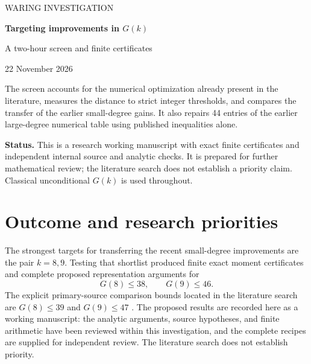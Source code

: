 \documentclass[11pt,letterpaper]{article}
\numberwithin{equation}{section}
\begin{document}
\begin{titlepage}
\thispagestyle{empty}
\vspace*{0.6in}
{\large\color{blue!45!black}WARING INVESTIGATION\par}
\vspace{0.3in}
{\huge\bfseries Targeting improvements in $G(k)$\par}
\vspace{0.22in}
{\Large A two-hour screen and finite certificates\par}
\vspace{0.18in}
{\large 22 November 2026\par}
\vspace{0.6in}
\par
\vspace{0.45in}
The screen accounts for the numerical optimization already present in the
literature, measures the distance to strict integer thresholds, and compares
the transfer of the earlier small-degree gains. It also repairs 44 entries
of the earlier large-degree numerical table using published inequalities
alone.
\par
\vfill
\textbf{Status.} This is a research working manuscript with exact finite
certificates and independent internal source and analytic checks. It is
prepared for further mathematical review; the literature search does not
establish a priority claim. Classical unconditional $G(k)$ is used throughout.
\end{titlepage}
\tableofcontents
\clearpage
{}

\section{Outcome and research priorities}
\label{sec:outcome}

The strongest targets for transferring the recent small-degree improvements
are the pair $k=8,9$.  Testing that shortlist produced finite exact moment
certificates and complete proposed representation arguments for
\[
                         \boxed{G(8)\le38,\qquad G(9)\le46.}
\]
The explicit primary-source comparison bounds located in the literature
search are $G(8)\le39$ and $G(9)\le47$ \cite{W16}.  The proposed results
are recorded here as a working manuscript: the analytic arguments, source
hypotheses, and finite arithmetic have been reviewed within this
investigation, and the complete recipes are supplied for independent review.
The literature search does not establish priority.
\end{document}
